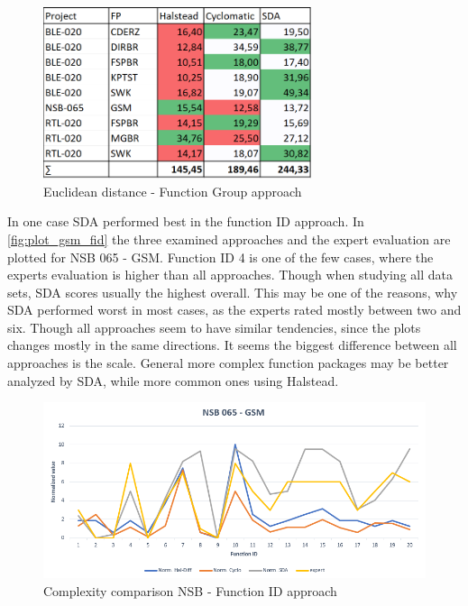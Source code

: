 \begin{figure}[ht] 
	\centering
	\includegraphics[width=0.7\textwidth]{graphic/FG_RESULT.png}
	\caption{Euclidean distance - Function Group approach}
	\label{fig:fg_result}
\end{figure}

In one case SDA performed best in the function ID approach. In \autoref{fig:plot_gsm_fid} the three examined approaches and the expert evaluation are plotted for NSB 065 - GSM. Function ID 4 is one of the few cases, where the experts evaluation is higher than all approaches. Though when studying all data sets, SDA scores usually the highest overall. This may be one of the reasons, why SDA performed worst in most cases, as the experts rated mostly between two and six. Though all approaches seem to have similar tendencies, since the plots changes mostly in the same directions. It seems the biggest difference between all approaches is the scale. General more complex function packages may be better analyzed by SDA, while more common ones using Halstead.

\begin{figure}[ht]
	\centering
	\includegraphics[width=1\textwidth]{graphic/NSB-GSM_plot.png}
	\caption{Complexity comparison NSB - Function ID approach}
	\label{fig:plot_gsm_fid}	
\end{figure}

